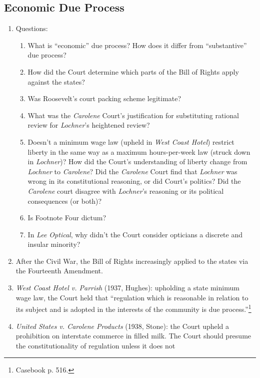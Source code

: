 \subsection{Economic Due Process}

\begin{enumerate}
    \item Questions:
    \begin{enumerate}
        \item What is ``economic'' due process? How does it differ from 
        ``substantive'' due process?
        \item How did the Court determine which parts of the Bill of Rights apply 
        against the states?
        \item Was Roosevelt's court packing scheme legitimate?
        \item What was the \emph{Carolene} Court's justification for substituting 
        rational review for \emph{Lochner}'s heightened review?
        \item Doesn't a minimum wage law (upheld in \emph{West Coast Hotel}) 
        restrict liberty in the same way as a maximum hours-per-week law (struck 
        down in \emph{Lochner})? How did the Court's understanding of liberty 
        change from \emph{Lochner} to \emph{Carolene}? Did the \emph{Carolene} 
        Court find that \emph{Lochner} was wrong in its constitutional 
        reasoning, or did Court's politics? Did the \emph{Carolene} court 
        disagree with \emph{Lochner}'s reasoning or its political consequences 
        (or both)?
        \item Is Footnote Four dictum?
        \item In \emph{Lee Optical}, why didn't the Court consider opticians a 
        discrete and insular minority?
    \end{enumerate}
    \item After the Civil War, the Bill of Rights increasingly applied to the 
    states via the Fourteenth Amendment.
    \item \emph{West Coast Hotel v. Parrish} (1937, Hughes): upholding a state 
    minimum wage law, the Court held that ``regulation which is reasonable in 
    relation to its subject and is adopted in the interests of the community 
    is due process.''\footnote{Casebook p. 516.}
    \item \emph{United States v. Carolene Products} (1938, Stone): the Court 
    upheld a prohibition on interstate commerce in filled milk. The Court 
    should presume the constitutionality of regulation unless it does not 

\end{enumerate}
